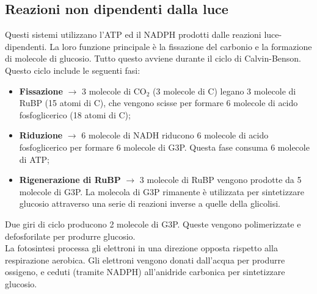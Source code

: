 \subsection{Reazioni non dipendenti dalla luce}
Questi sistemi utilizzano l'ATP ed il NADPH prodotti dalle reazioni luce-dipendenti. La loro funzione principale \`e la fissazione del carbonio e la formazione di molecole di glucosio. Tutto questo avviene durante il ciclo di Calvin-Benson. Questo ciclo include le seguenti fasi:
\begin{itemize}
    \item \textbf{Fissazione} $\xrightarrow{}$ 3 molecole di CO$_2$ (3 molecole di C) legano 3 molecole di RuBP (15 atomi di C), che vengono scisse per formare 6 molecole di acido fosfoglicerico (18 atomi di C);
    \item \textbf{Riduzione} $\xrightarrow{}$ 6 molecole di NADH riducono 6 molecole di acido fosfoglicerico per formare 6 molecole di G3P. Questa fase consuma 6 molecole di ATP;
    \item \textbf{Rigenerazione di RuBP} $\xrightarrow{}$ 3 molecole di RuBP vengono prodotte da 5 molecole di G3P. La molecola di G3P rimanente \`e utilizzata per sintetizzare glucosio attraverso una serie di reazioni inverse a quelle della glicolisi.
\end{itemize}
Due giri di ciclo producono 2 molecole di G3P. Queste vengono polimerizzate e defosforilate per produrre glucosio. 
\\La fotosintesi processa gli elettroni in una direzione opposta rispetto alla respirazione aerobica. Gli elettroni vengono donati dall'acqua per produrre ossigeno, e ceduti (tramite NADPH) all'anidride carbonica per sintetizzare glucosio.
